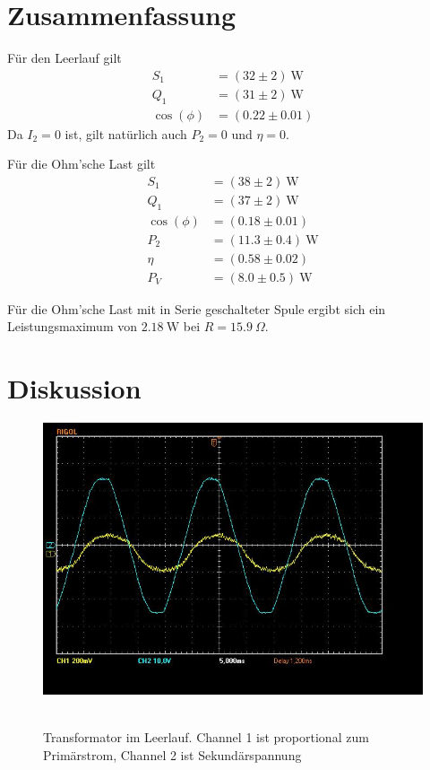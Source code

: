 \documentclass{article}
\newcommand{\W}{\text{W}}
\begin{document}
\section{Zusammenfassung}

Für den Leerlauf gilt
\begin{align*}
S_1 &= (32 \pm 2)~\W \\
Q_1 &= (31 \pm 2)~\W \\
\cos(\phi) &= (0.22 \pm 0.01)
\end{align*}
Da $I_2=0$ ist, gilt natürlich auch $P_2=0$ und $\eta = 0$.


Für die Ohm'sche Last gilt
\begin{align*}
S_1 &= (38 \pm 2)~\W \\
Q_1 &= (37 \pm 2)~\W \\
\cos(\phi) &= (0.18 \pm 0.01) \\
P_2 &= (11.3 \pm 0.4)~\W \\
\eta &= (0.58 \pm 0.02) \\
P_V &= (8.0 \pm 0.5)~\W
\end{align*}


Für die Ohm'sche Last mit in Serie geschalteter Spule ergibt sich ein Leistungsmaximum von $2.18~\W$ bei $R=15.9~\Omega$.

\section{Diskussion}



\begin{figure}[H]
\caption{Transformator im Leerlauf. Channel 1 ist proportional zum Primärstrom, Channel 2 ist Sekundärspannung}
\label{fig:task1}
{\centering
\includegraphics[scale=0.4]{task1.jpg}
~
}
\end{figure}
\end{document}
